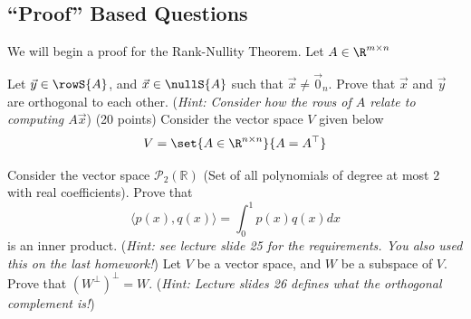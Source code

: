 \documentclass[12pt,addpoints]{exam}
\renewcommand{\P}[1]{\mathcal{P}_{#1}\left(\mathbb{R}\right)}
\begin{document}
    \vfill
    \begin{center}
        \gradetable[h]
    \end{center}
    \newpage
    \begin{questions}
        \section*{``Proof'' Based Questions}
        \question[15] We will begin a proof for the Rank-Nullity Theorem. Let $A\in\R^{m\times n}$

        Let $\vec{y}\in\rowS{A}$, and $\vec{x}\in\nullS{A}$ such that $\vec{x}\neq\vec{0}_n$. Prove
        that $\vec{x}$ and $\vec{y}$ are orthogonal to each other. (\emph{Hint: Consider how the rows of
        $A$ relate to computing $A\vec{x}$})
        \newpage
        \question (20 points) Consider the vector space $V$ given below
        \[
            V = \set{A\in\R^{n\times n}}{A = A^\top}
        \]
        \vfill
        \vfill
        \newpage
        \question[20] Consider the vector space $\P{2}$ (Set of all polynomials of degree at
        most $2$ with real coefficients). Prove that
        \[
            \langle p(x), q(x)\rangle = \int_0^1 p(x)q(x) dx
        \]
        is an inner product.
        (\emph{Hint: see lecture slide 25 for the requirements. You also used this on the last homework!})
        \newpage
        \question[10] Let $V$ be a vector space, and $W$ be a subspace of $V$. Prove that
        $\left(W^\perp\right)^\perp = W$. (\emph{Hint: Lecture slides 26 defines what the orthogonal
        complement is!})
        \vfill

\end{questions}
\end{document}
